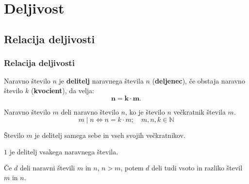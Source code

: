 \section{Deljivost}

\begin{frame}
    \sectionpage
\end{frame}

\begin{frame}
\end{frame}

    \subsection{Relacija deljivosti}

        \begin{frame}
            \frametitle{Relacija deljivosti}

            \begin{alertblock}{}
                Naravno število $n$ je \textbf{delitelj} naravnega števila $n$ (\textbf{deljenec}), če obstaja naravno število $k$ (\textbf{kvocient}), da velja: $$\mathbf{n=k\cdot m}.$$
            \end{alertblock}

            \begin{alertblock}{}
                Naravno število $m$ deli naravno število $n$, ko je število $n$ večkratnik števila $m$. $$m\mid n \Leftrightarrow n=k\cdot m;\quad m,n,k\in\mathbb{N}$$
            \end{alertblock}

            \begin{block}{}
                    Število $m$ je delitelj samega sebe in vseh svojih večkratnikov.
            \end{block}

            \begin{block}{}
                $1$ je delitelj vsakega naravnega števila.
            \end{block}

            \begin{block}{}
                Če $d$ deli naravni števili $m$ in $n$, $n>m$, potem $d$ deli tudi vsoto in razliko števil $m$ in $n$.
            \end{block}

        \end{frame}

